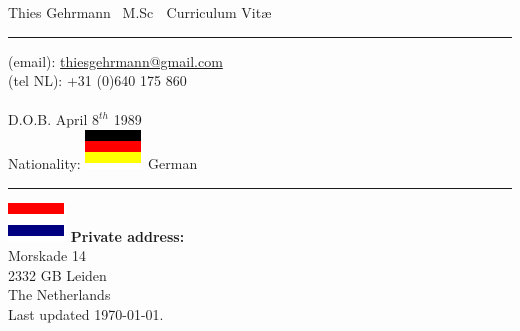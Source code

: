 \documentclass[letterpaper, 10pt]{article} %
\def\doctitle{\color{BrickRed}Curriculum Vit\ae}
\def\name{\color{MidnightBlue}Thies Gehrmann}
\def\maxdeg{\color{Black}M.Sc}
\begin{document}
\small

\pagestyle{plain}

\label{top}

{\huge {\textbf \name} {\footnotesize $\,$ \maxdeg} $\;$ {\textbf \doctitle} }
\vspace{0.1cm}
\hrule
\vspace{0.5cm}


\begin{minipage}[t]{0.50\textwidth}
  (email): \href{mailto:thiesgehrmann@gmail.com}{thiesgehrmann@gmail.com} \\
  (tel NL): +31 (0)640 175 860     \\
  \\
  D.O.B. April $8^{th}$ 1989 \\
  Nationality: \includegraphics[scale=0.4]{de.eps} German\\
  \hrule
  \vspace{5pt}

\end{minipage}
\hfill
\begin{minipage}[t]{0.30\textwidth}
  \includegraphics[scale=0.4]{nl.eps}
  \textbf{Private address:} \\
  Morskade 14 \\
  2332 GB Leiden \\
  The Netherlands \\

  Last updated \today.
\end{minipage}
\end{document}
